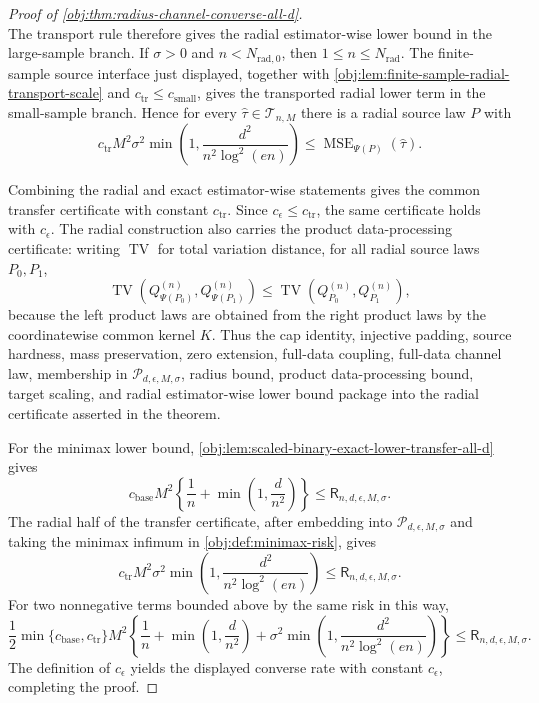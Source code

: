 \documentclass[11pt]{article}
\begin{document}
\begin{proof}[Proof of \cref{obj:thm:radius-channel-converse-all-d}]
\[\]
The transport rule therefore gives the radial estimator-wise lower bound in the large-sample branch.  If \(\sigma>0\) and \(n<N_{\mathrm{rad},0}\), then \(1\le n\le N_{\mathrm{rad}}\).  The finite-sample source interface just displayed, together with \cref{obj:lem:finite-sample-radial-transport-scale} and \(c_{\mathrm{tr}}\le c_{\mathrm{small}}\), gives the transported radial lower term in the small-sample branch.  Hence for every \(\widehat\tau\in\mathcal T_{n,M}\) there is a radial source law \(P\) with
\[
c_{\mathrm{tr}}M^2\sigma^2
\min\left(1,\frac{d^2}{n^2\log^2(en)}\right)
\le
\operatorname{MSE}_{\Psi(P)}(\widehat\tau).
\]

Combining the radial and exact estimator-wise statements gives the common transfer certificate with constant \(c_{\mathrm{tr}}\).  Since \(c_\epsilon\le c_{\mathrm{tr}}\), the same certificate holds with \(c_\epsilon\).  The radial construction also carries the product data-processing certificate: writing \(\operatorname{TV}\) for total variation distance, for all radial source laws \(P_0,P_1\),
\[
\operatorname{TV}\!\left(Q_{\Psi(P_0)}^{(n)},Q_{\Psi(P_1)}^{(n)}\right)
\le
\operatorname{TV}\!\left(Q_{P_0}^{(n)},Q_{P_1}^{(n)}\right),
\]
because the left product laws are obtained from the right product laws by the coordinatewise common kernel \(K\).  Thus the cap identity, injective padding, source hardness, mass preservation, zero extension, full-data coupling, full-data channel law, membership in \(\mathcal P_{d,\epsilon,M,\sigma}\), radius bound, product data-processing bound, target scaling, and radial estimator-wise lower bound package into the radial certificate asserted in the theorem.

For the minimax lower bound, \cref{obj:lem:scaled-binary-exact-lower-transfer-all-d} gives
\[
c_{\mathrm{base}}M^2
\left\{\frac1n+\min\left(1,\frac d{n^2}\right)\right\}
\le
\mathsf R_{n,d,\epsilon,M,\sigma}.
\]
The radial half of the transfer certificate, after embedding into \(\mathcal P_{d,\epsilon,M,\sigma}\) and taking the minimax infimum in \cref{obj:def:minimax-risk}, gives
\[
c_{\mathrm{tr}}M^2\sigma^2
\min\left(1,\frac{d^2}{n^2\log^2(en)}\right)
\le
\mathsf R_{n,d,\epsilon,M,\sigma}.
\]
For two nonnegative terms bounded above by the same risk in this way,
\[
\frac12\min\{c_{\mathrm{base}},c_{\mathrm{tr}}\}M^2
\left\{
\frac1n+\min\left(1,\frac d{n^2}\right)
+\sigma^2\min\left(1,\frac{d^2}{n^2\log^2(en)}\right)
\right\}
\le
\mathsf R_{n,d,\epsilon,M,\sigma}.
\]
The definition of \(c_\epsilon\) yields the displayed converse rate with constant \(c_\epsilon\), completing the proof. %
\end{proof}




\end{document}
